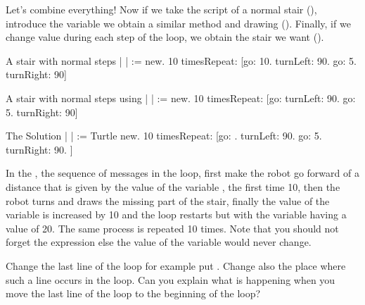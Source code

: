 Let's combine everything! Now if we take the script of a normal stair (), introduce the variable  we obtain a similar method and drawing
(). Finally, if we change   value during each step of the loop, we obtain the stair we want ().

\begin{scriptwithtitle}{A stair with normal steps}\label{src:normalstair}
| \caro |
\caro := \Turtle new.
10 timesRepeat: [\caro go: 10.
                \caro turnLeft: 90.
                \caro go: 5.
                \caro turnRight: 90]
\end{scriptwithtitle}

\begin{scriptwithtitle}{A stair with normal steps using }\label{src:normalstairlength}
| \caro {}|
\caro := \Turtle new.
10 timesRepeat: [\caro go: 
                \caro turnLeft: 90.
                \caro go: 5.
                \caro turnRight: 90]
\end{scriptwithtitle}

\begin{scriptwithtitle}{The Solution}\label{src:strangestair}
| \caro {} |
\caro := Turtle new.
10 timesRepeat: [\caro go: .
                \caro turnLeft: 90.
                \caro go: 5.
                \caro turnRight: 90.
                ]
\end{scriptwithtitle}


In the , the sequence of messages in the loop, first make the robot go forward of a distance that is given by the value of the variable , the first time 10, then  the robot turns and draws the missing part of the stair, finally the value of the variable  is increased by 10 and the loop restarts but with the variable  having a value of 20. The same process is repeated 10 times.
Note that you should not forget the expression  else the value of the variable would never change.

\begin{exonofig}
Change the last line of the loop for example put .  Change also the place where such a line occurs in the
loop. Can you explain what is happening when you move the last line of the
loop to the beginning of the loop?
\end{exonofig}

